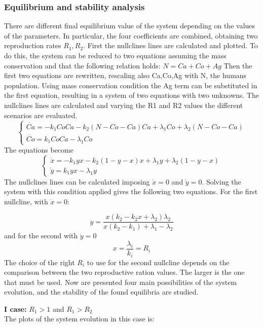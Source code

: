 \subsubsection{Equilibrium and stability analysis}
There are different final equilibrium value of the system depending on the values of the parameters. In particular, the four coefficients are combined, obtaining two reproduction rates $R_1,R_2$. 
First the nullclines lines are calculated and plotted. To do this, the system can be reduced to two equations assuming the mass conservation and that the following relation holds:
$N=Ca+Co+Ag$
Then the first  two equations are rewritten, rescaling also Ca,Co,Ag with N, the humans population. Using mass conservation condition the Ag term can be substituted in the first equation, resulting in a system of two equations with two unknowns. 
The nullclines lines are calculated and varying the R1 and R2 values the different scenarios are evaluated. 
\[
\begin{cases}
	\dot{Ca} = -k_1 Co Ca - k_2 (N-Co-Ca) Ca + \lambda_1 Co + \lambda_2 (N-Co-Ca)\\
	\dot{Co} = k_1 Co Ca - \lambda_1 Co
\end{cases}
\]
The equations become
\[
\begin{cases}
	\dot{x} = -k_1 y x - k_2 (1-y-x) x + \lambda_1 y + \lambda_2 (1-y-x)\\
	\dot{y} = k_1 y x - \lambda_1 y
\end{cases}
\]
The nullclines lines can be calculated imposing $\dot{x} = 0$ and $\dot{y} = 0$. Solving the system with this condition applied gives the following two equations. For the first nullcline, with $\dot{x} = 0$:

\begin{equation}
 y = \frac{x(k_2 - k_2 x + \lambda_2)  \lambda_2}{x(k_2 - k_1)+ \lambda_1- \lambda_2}
\end{equation}
and for the second with $\dot{y} = 0$
\[x = \frac{\lambda_i}{k_i} = R_i
\]
The choice of the right $R_i$ to use for the second nullcline depends on the comparison between the two reproductive ration values. The larger is the one that must be used. 
Now are presented four main possibilities of the system evolution, and the stability of the found equilibria are studied.

\textbf{I case:} $R_1 >1$ and $R_1> R_2$ \\
The plots of the system evolution in this case is:

